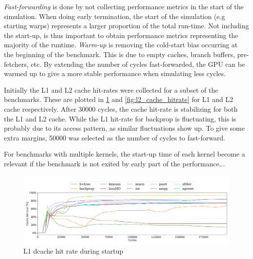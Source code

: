 
\textit{Fast-forwarding} is done by not collecting performance metrics in the start of the simulation. When doing early termination, the start of the simulation (e.g starting warps) represents a larger proportion of the total run-time. Not including the start-up, is thus important to obtain performance metrics representing the majority of the runtime. \textit{Warm-up} is removing the cold-start bias occurring at the beginning of the benchmark. This is due to empty caches, branch buffers, pre-fetchers, etc. By extending the number of cycles fast-forwarded, the GPU can be warmed up to give a more stable performance when simulating less cycles.

Initially the L1 and L2 cache hit-rates were collected for a subset of the benchmarks. These are plotted in \ref{fig:l1_cache_hitrate} and \ref{fig:l2_cache_hitrate} for L1 and L2 cache respectively. After 30000 cycles, the cache hit-rate is stabilizing for both the L1 and L2 cache. While the L1 hit-rate for backprop is fluctuating, this is probably due to its access pattern, as similar fluctuations show up. To give some extra margins, 50000 was selected as the number of cycles to fast-forward.

For benchmarks with multiple kernels, the start-up time of each kernel become a relevant if the benchmark is not exited by early part of the performance...

\begin{figure}
    \centering
    \includegraphics[width=\textwidth]{figures/L1cachehit_vlsim.png}
    \caption{L1 dcache hit rate during startup}
    \label{fig:l1_cache_hitrate}
\end{figure}


